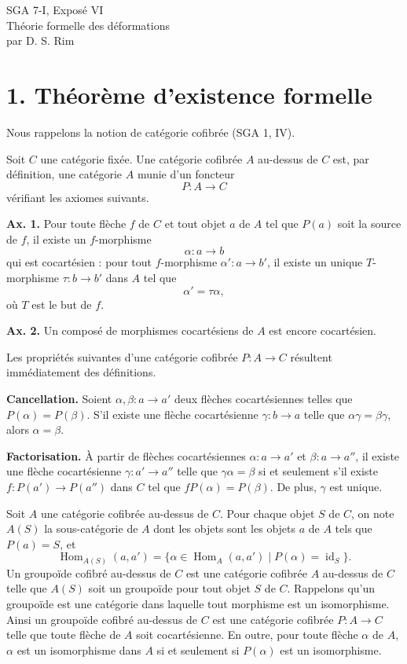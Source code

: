 \documentclass[11pt]{article}
\providecommand{\Hom}{\operatorname{Hom}}
\providecommand{\id}{\operatorname{id}}
\begin{document}
\begin{center}
{\Large SGA 7-I, Expos\'e VI}\\[0.4em]
{\large Th\'eorie formelle des d\'eformations}\\[0.4em]
par D. S. Rim
\end{center}

\section*{1. Th\'eor\`eme d'existence formelle}

Nous rappelons la notion de cat\'egorie cofibr\'ee (SGA 1, IV).

Soit $C$ une cat\'egorie fix\'ee. Une cat\'egorie cofibr\'ee $A$ au-dessus de $C$ est, par d\'efinition, une cat\'egorie $A$ munie d'un foncteur
\[
 P:A\longrightarrow C
\]
v\'erifiant les axiomes suivants.

\textbf{Ax. 1.} Pour toute fl\`eche $f$ de $C$ et tout objet $a$ de $A$ tel que $P(a)$ soit la source de $f$, il existe un $f$-morphisme
\[
 \alpha:a\longrightarrow b
\]
qui est cocart\'esien : pour tout $f$-morphisme $\alpha':a\to b'$, il existe un unique $T$-morphisme $\tau:b\to b'$ dans $A$ tel que
\[
 \alpha'=\tau\alpha,
\]
o\`u $T$ est le but de $f$.

\textbf{Ax. 2.} Un compos\'e de morphismes cocart\'esiens de $A$ est encore cocart\'esien.

Les propri\'et\'es suivantes d'une cat\'egorie cofibr\'ee $P:A\to C$ r\'esultent imm\'ediatement des d\'efinitions.

\textbf{Cancellation.} Soient $\alpha,\beta:a\to a'$ deux fl\`eches cocart\'esiennes telles que $P(\alpha)=P(\beta)$. S'il existe une fl\`eche cocart\'esienne $\gamma:b\to a$ telle que $\alpha\gamma=\beta\gamma$, alors $\alpha=\beta$.

\textbf{Factorisation.} \`A partir de fl\`eches cocart\'esiennes $\alpha:a\to a'$ et $\beta:a\to a''$, il existe une fl\`eche cocart\'esienne $\gamma:a'\to a''$ telle que $\gamma\alpha=\beta$ si et seulement s'il existe $f:P(a')\to P(a'')$ dans $C$ tel que $fP(\alpha)=P(\beta)$. De plus, $\gamma$ est unique.

Soit $A$ une cat\'egorie cofibr\'ee au-dessus de $C$. Pour chaque objet $S$ de $C$, on note $A(S)$ la sous-cat\'egorie de $A$ dont les objets sont les objets $a$ de $A$ tels que $P(a)=S$, et
\[
 \Hom_{A(S)}(a,a')=\{\alpha\in\Hom_A(a,a')\mid P(\alpha)=\id_S\}.
\]
Un groupo\"ide cofibr\'e au-dessus de $C$ est une cat\'egorie cofibr\'ee $A$ au-dessus de $C$ telle que $A(S)$ soit un groupo\"ide pour tout objet $S$ de $C$. Rappelons qu'un groupo\"ide est une cat\'egorie dans laquelle tout morphisme est un isomorphisme. Ainsi un groupo\"ide cofibr\'e au-dessus de $C$ est une cat\'egorie cofibr\'ee $P:A\to C$ telle que toute fl\`eche de $A$ soit cocart\'esienne. En outre, pour toute fl\`eche $\alpha$ de $A$, $\alpha$ est un isomorphisme dans $A$ si et seulement si $P(\alpha)$ est un isomorphisme.
\end{document}
